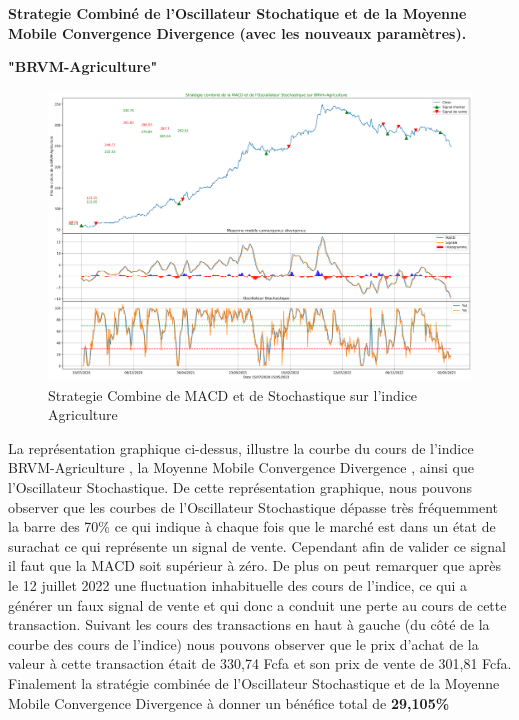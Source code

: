 \item[\ding{226}]\textbf{Strategie Combiné de l'Oscillateur Stochatique et de la 
Moyenne Mobile Convergence Divergence (avec les nouveaux paramètres).}

\begin{center}     \textbf{"BRVM-Agriculture"}  \end{center}
\begin{figure}[h]
    \centering
    \includegraphics[width=1 \textwidth ]{img/MACD-Agri.png}
    \caption{Strategie Combine de MACD et de Stochastique sur l'indice Agriculture}
    \label{fig:Strategie Combine de MACD et de Stochastique sur l'indice Agriculture}
\end{figure}
\par{La représentation graphique ci-dessus, illustre la courbe du cours de l'indice BRVM-Agriculture , 
la Moyenne Mobile Convergence Divergence , ainsi que l'Oscillateur Stochastique. De cette
représentation graphique, nous pouvons observer que les courbes de l'Oscillateur Stochastique 
dépasse très fréquemment la barre des 70\% ce qui indique à chaque fois que le marché est dans 
un état de surachat ce qui représente un signal de vente. Cependant afin de valider 
ce signal il faut que la MACD soit supérieur à zéro. 
De plus on peut remarquer que 
après le 12 juillet 2022 une fluctuation inhabituelle des cours de l'indice, ce 
qui a générer un faux signal de vente et qui donc a conduit une perte au cours de cette
transaction. Suivant les cours des transactions en haut à gauche (du côté de la courbe des cours
de l'indice) nous pouvons observer que le prix d'achat de la valeur à cette transaction 
était de 330,74 Fcfa et son prix de vente de 301,81 Fcfa. 
Finalement la stratégie combinée
de l'Oscillateur Stochastique et de la Moyenne Mobile Convergence Divergence à donner un 
bénéfice total de \textbf{29,105\%} } 




